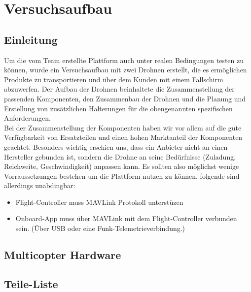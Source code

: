 \chapter{Versuchsaufbau}

\section{Einleitung}

Um die vom Team erstellte Plattform auch unter realen Bedingungen testen zu können, wurde ein Versuchsaufbau mit zwei Drohnen erstellt, die es ermöglichen Produkte zu transportieren und über dem Kunden mit einem Fallschirm abzuwerfen. Der Aufbau der Drohnen beinhaltete die Zusammenstellung der passenden Komponenten, den Zusammenbau der Drohnen und die Planung und Erstellung von zusätzlichen Halterungen für die obengenannten spezifischen Anforderungen.\\

Bei der Zusammenstellung der Komponenten haben wir vor allem auf die gute Verfügbarkeit von Ersatzteilen und einen hohen Marktanteil der Komponenten geachtet. Besonders wichtig erschien uns, dass ein Anbieter nicht an einen Hersteller gebunden ist, sondern die Drohne an seine Bedürfnisse (Zuladung, Reichweite, Geschwindigkeit) anpassen kann. Es sollten also möglichst wenige Vorraussetzungen bestehen um die Plattform nutzen zu können, folgende sind allerdings unabdingbar:

\begin{itemize}

\item Flight-Controller muss \Gls{MAVLink} Protokoll unterstüzen
\item Onboard-App muss über MAVLink mit dem Flight-Controller verbunden sein. (Über USB oder eine Funk-Telemetrieverbindung.)
\end{itemize}

\section{Multicopter Hardware}

\section{Teile-Liste}

